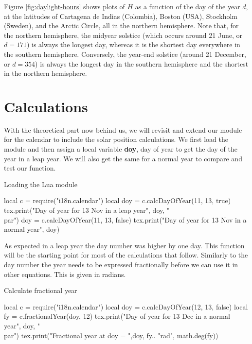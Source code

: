 Figure \ref{fig:daylight-hours} shows plots of $H$ as a function of the day of the year $d$, at the latitudes of Cartagena de Indias (Colombia), Boston (USA), Stockholm (Sweden), and the Arctic Circle, all in the northern hemisphere.  Note that, for the northern hemisphere, the midyear solstice (which occurs around 21 June, or $d=171$) is always the longest day, whereas it is the shortest day everywhere in the southern hemisphere.  Conversely, the year-end solstice (around 21 December, or $d = 354$) is always the longest day in the southern hemisphere and the shortest in the northern hemisphere.
 
\section{Calculations}

With the theoretical part now behind us, we will revisit and extend our module for the calendar
to include the solar position calculations. We first load the module and then assign a local variable \textbf{doy}, day of year to get the day of the year in a leap year. We will also get the same for a normal year to compare and test our function.

\begin{texexample}{Loading the Lua module}{}
\begin{luacode}
local c = require("i18n.calendar") 
local doy = c.calcDayOfYear(11, 13, true)
tex.print("Day of year for 13 Nov in a leap year", doy, "\\par")
doy = c.calcDayOfYear(11, 13, false)
tex.print("Day of year for 13 Nov in a normal year", doy)
\end{luacode}
\end{texexample}
As expected in a leap year the day number was higher by one day.  This function will be the starting point for most of the calculations that follow. Similarly to the day number the year needs to be expressed fractionally before we can use it in other equations. This is given in radians.

\begin{texexample}{Calculate fractional year}{}
\begin{luacode}
local c = require("i18n.calendar") 
local doy = c.calcDayOfYear(12, 13, false)
local fy = c.fractionalYear(doy, 12)
tex.print("Day of year for 13 Dec in a normal year", doy, "\\par")
tex.print("Fractional year at doy = ",doy, fy.. "rad", math.deg(fy))
\end{luacode}
\end{texexample}

